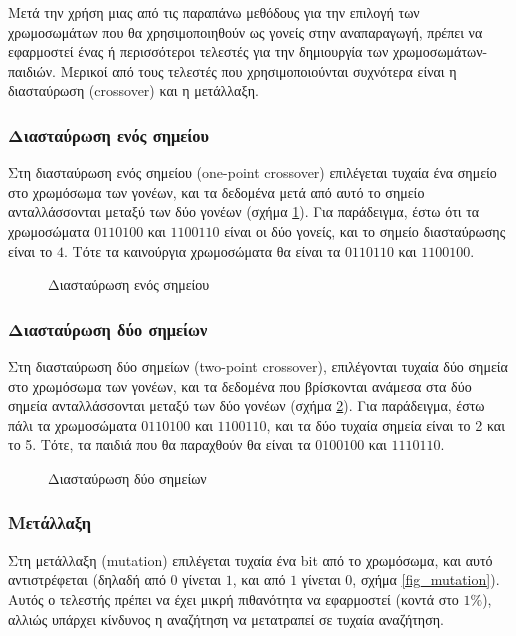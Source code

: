 Μετά την χρήση μιας από τις παραπάνω μεθόδους για την επιλογή των χρωμοσωμάτων που θα χρησιμοποιηθούν ως γονείς στην αναπαραγωγή, πρέπει να εφαρμοστεί ένας ή περισσότεροι τελεστές για την δημιουργία των χρωμοσωμάτων-παιδιών. Μερικοί από τους τελεστές που χρησιμοποιούνται συχνότερα είναι η διασταύρωση (crossover) και η μετάλλαξη.

\subsubsection{Διασταύρωση ενός σημείου}

Στη διασταύρωση ενός σημείου (one-point crossover) επιλέγεται τυχαία ένα σημείο στο χρωμόσωμα των γονέων, και τα δεδομένα μετά από αυτό το σημείο ανταλλάσσονται μεταξύ των δύο γονέων (σχήμα \ref{fig_opc}). Για παράδειγμα, έστω ότι τα χρωμοσώματα $0110100$ και $1100110$ είναι οι δύο γονείς, και το σημείο διασταύρωσης είναι το $4$. Τότε τα καινούργια χρωμοσώματα θα είναι τα $0110110$ και $1100100$.

\begin{figure}[!t]
    \centering
    \def\svgwidth{2.5in}
    
    \caption{Διασταύρωση ενός σημείου \cite{opc_fig}}
    \label{fig_opc}
\end{figure}

\subsubsection{Διασταύρωση δύο σημείων}

Στη διασταύρωση δύο σημείων (two-point crossover), επιλέγονται τυχαία δύο σημεία στο χρωμόσωμα των γονέων, και τα δεδομένα που βρίσκονται ανάμεσα στα δύο σημεία ανταλλάσσονται μεταξύ των δύο γονέων (σχήμα \ref{fig_tpc}). Για παράδειγμα, έστω πάλι τα χρωμοσώματα $0110100$ και $1100110$, και τα δύο τυχαία σημεία είναι το 2 και το 5. Τότε, τα παιδιά που θα παραχθούν θα είναι τα $0100100$ και $1110110$.

\begin{figure}[!t]
    \centering
    \def\svgwidth{2.5in}
    
    \caption{Διασταύρωση δύο σημείων \cite{tpc_fig}}
    \label{fig_tpc}
\end{figure}

\subsubsection{Μετάλλαξη}

Στη μετάλλαξη (mutation) επιλέγεται τυχαία ένα bit από το χρωμόσωμα, και αυτό αντιστρέφεται (δηλαδή από $0$ γίνεται $1$, και από $1$ γίνεται $0$, σχήμα \ref{fig_mutation}). Αυτός ο τελεστής πρέπει να έχει μικρή πιθανότητα να εφαρμοστεί (κοντά στο $1\%$), αλλιώς υπάρχει κίνδυνος η αναζήτηση να μετατραπεί σε τυχαία αναζήτηση. \cite{zotero-PNQJ3TKI}

